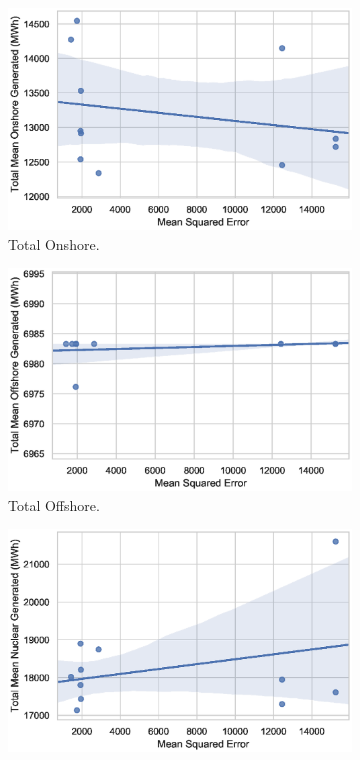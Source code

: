 \begin{figure}[h!]
\begin{subfigure}[b]{0.3\textwidth}
\includegraphics[width=\columnwidth]{Chapter5/figures/market-forecasting/results/elecsim_results/results_2/total_Onshore_mean_output.eps}
\caption{Total Onshore.}
\label{fig:total_Onshore_mean_output}
\end{subfigure}
\medskip
\begin{subfigure}[b]{0.3\textwidth}   
\includegraphics[width=\columnwidth]{Chapter5/figures/market-forecasting/results/elecsim_results/results_2/total_Offshore_mean_output.eps}
\caption{Total Offshore.}
\label{fig:total_Offshore_mean_output}
\end{subfigure}
\hfil
\begin{subfigure}[b]{0.3\textwidth}
\includegraphics[width=\columnwidth]{Chapter5/figures/market-forecasting/results/elecsim_results/results_2/total_Nuclear_mean_output.eps}

\end{subfigure}
\end{figure}
